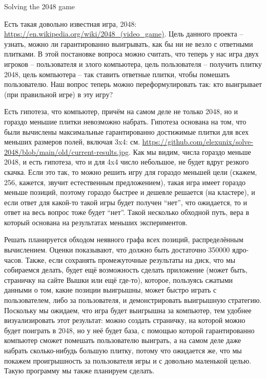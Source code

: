\documentclass[a4paper,12pt]{article}
\begin{document}
\begin{center} \Large Solving the 2048 game \end{center}
\vspace{30pt}

Есть такая довольно известная игра, 2048: \url{https://en.wikipedia.org/wiki/2048_(video_game)}.
Цель данного проекта -- узнать, можно ли гарантированно выигрывать, как бы ни не везло с ответными плитками. В этой постановке вопроса можно считать, что теперь у нас игра двух игроков -- пользователя и злого компьютера, цель пользователя -- получить плитку 2048, цель компьютера -- так ставить ответные плитки, чтобы помешать пользователю. Наш вопрос теперь можно переформулировать так: кто выигрывает (при правильной игре) в эту игру?

Есть гипотеза, что компьютер, причём на самом деле не только 2048, но и гораздо меньшие плитки невозможно набрать. Гипотеза основана на том, что были вычислены максимальные гарантированно достижимые плитки для всех меньших размеров полей, включая 3x4: см. \url{https://github.com/elexunix/solve-2048/blob/main/old/current-results.jpg}. Как мы видим, числа гораздо меньше 2048, и есть гипотеза, что и для 4x4 число небольшое, не будет вдруг резкого скачка. Если это так, то можно решить игру для гораздо меньшей цели (скажем, 256, кажется, звучит естественным предложением), такая игра имеет гораздо меньше позиций, поэтому гораздо быстрее и дешевле решается (на кластере), и если ответ для какой-то такой игры будет получен ``нет'', что ожидается, то и ответ на весь вопрос тоже будет ``нет''. Такой несколько обходной путь, вера в который основана на результатах меньших экспериментов.

Решать планируется обходом неявного графа всех позиций, распределённым вычислением. Оценки показывают, что должно быть достаточно 350000 ядро-часов. Также, если сохранять промежуточные результаты на диск, что мы собираемся делать, будет ещё возможность сделать приложение (может быть, страничку на сайте Вышки или ещё где-то), которое, пользуясь сжатыми данными о том, какие позиции выигрышны, может быстро играть с пользователем, либо за пользователя, и демонстрировать выигрышную стратегию. Поскольку мы ожидаем, что игра будет выигрышна за компьютер, тем удобнее визуализировать этот результат: можно создать страничку, на которой можно будет поиграть в 2048, но у неё будет база, с помощью которой гарантированно компьютер сможет помешать пользователю выиграть, а на самом деле даже набрать сколько-нибудь большую плитку, потому что ожидается же, что мы покажем проигрышность за пользователя игры и с довольно маленькой целью. Такую программу мы также планируем сделать.
\end{document}
